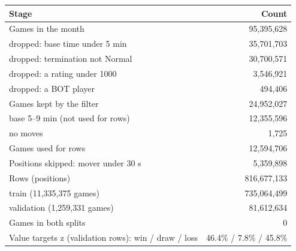 \begin{tabular}{lr}
\toprule
Stage & Count \\
\midrule
Games in the month & 95,395,628 \\
\quad dropped: base time under 5 min & 35,701,703 \\
\quad dropped: termination not Normal & 30,700,571 \\
\quad dropped: a rating under 1000 & 3,546,921 \\
\quad dropped: a BOT player & 494,406 \\
Games kept by the filter & 24,952,027 \\
\quad base 5--9 min (not used for rows) & 12,355,596 \\
\quad no moves & 1,725 \\
Games used for rows & 12,594,706 \\
Positions skipped: mover under 30 s & 5,359,898 \\
Rows (positions) & 816,677,133 \\
\quad train (11,335,375 games) & 735,064,499 \\
\quad validation (1,259,331 games) & 81,612,634 \\
Games in both splits & 0 \\
\midrule
Value targets z (validation rows): win / draw / loss & 46.4\% / 7.8\% / 45.8\% \\
\bottomrule
\end{tabular}

